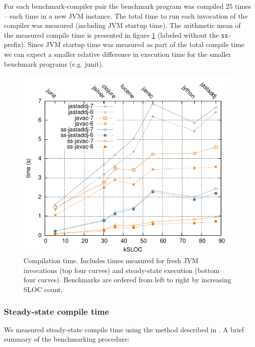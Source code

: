{For each benchmark-compiler pair the benchmark program was compiled 25 times --
each time in a new JVM instance.  The total time to run each invocation of the
compiler was measured (including JVM startup time).  The arithmetic mean of the
measured compile time is presented in figure \ref{fig:bm-time} (labeled without
the \verb'ss-' prefix).  Since JVM startup time was measured as part of the
total compile time we can expect a smaller relative difference in execution
time for the smaller benchmark programs (e.g. junit).

\begin{figure}
	\includegraphics[width=\textwidth]{figures/bm-time}
	\caption{Compilation time. Includes times measured for fresh JVM
	invocations (top four curves) and steady-state execution (bottom four curves). Benchmarks are ordered from left
	to right by increasing SLOC count.}
	\label{fig:bm-time}
\end{figure}

\subsubsection{Steady-state compile time}
\label{steady-state}

We measured steady-state compile time using the method described in
\cite{georges2007statistically}.  A brief summary of the benchmarking
procedure:

\begin{itemize}
	

\end{itemize}}
